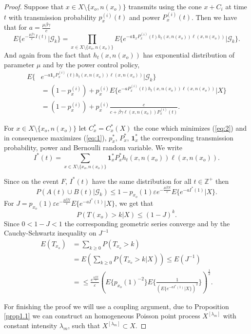 \begin{proof}
Suppose that $x\in X\setminus\lbrace x_o,n(x_o)\rbrace$ transmits using the cone $x+C_i$ at time $t$ with transmission probability $p_x^{(i)}(t)$ and power $P_x^{(i)}(t)$. Then we have that for $a=\frac{\mu\beta\gamma}{c}$
$$E\lbrace e^{-\frac{\mu\beta\gamma}{c}I(t)}\vert\mathcal{G}_k\rbrace=\prod_{x\in X\setminus\lbrace x_o,n(x_o)\rbrace}E\lbrace e^{-a\textbf{1}_x P_x^{(i)}(t)h_t(x,n(x_o))\ell(x,n(x_o))}\vert\mathcal{G}_k\rbrace.$$ And again from the fact that $h_t(x,n(x_o))$ has exponential distribution of parameter $\mu$ and by the power control policy,
\begin{align}
E\lbrace & e^{-a\textbf{1}_x P_x^{(i)}(t)h_t(x,n(x_o))\ell(x,n(x_o))}\vert\mathcal{G}_k\rbrace\nonumber\\
&=(1-p_x^{(i)})+p_x^{(i)}E\lbrace e^{-aP_x^{(i)}(t)h_t(x,n(x_o))\ell(x,n(x_o))}\vert X\rbrace\nonumber\\
&=(1-p_x^{(i)})+p_x^{(i)}\frac{c}{c+\beta\gamma\ell(x,n(x_o))P_x^{(i)}(t)}.\label{eq:2}
\end{align}

For $x\in X\setminus\lbrace x_o,n(x_o)\rbrace$ let $C_{x}^{*}=C_{x}^{*}(X)$ the cone which minimizes (\ref{eq:2}) and in consequence maximizes (\ref{eq:1}), $p^{*}_x$, $P^{*}_x$, $\textbf{1}^{*}_x$ the corresponding transmission probability, power and Bernoulli random variable. We write
$$I^{*}(t)=\sum_{x\in X\setminus\lbrace x_o,n(x_o)\rbrace}\textbf{1}_{x}^*P_{x}^*h_t(x,n(x_o))\ell(x,n(x_o)). $$

Since on the event $F$, $I^*(t)$ have the same distribution for all $t\in\mathbb{Z}^+$ then
$$P(A(t)\cup B(t)\vert\mathcal{G}_k)\leq 1-p_{x_o}(1)\varepsilon e^{-\frac{\mu\beta N}{c}}E\lbrace e^{-aI^*(1)}\vert X\rbrace.$$ For $J=p_{x_o}(1)\varepsilon e^{-\frac{\mu\beta N}{c}}E\lbrace e^{-aI^*(1)}\vert X\rbrace$, we get that $$P(T(x_o)>k\vert X)\leq (1-J)^k.$$ Since $0< 1-J< 1 $ the corresponding geometric series converge and by the Cauchy-Schwartz inequality on $J^{-1}$ 
\begin{align*}
E(T_{x_o})&=\sum_{k\geq 0}P(T_{x_o}>k)\\
&=E(\sum_{k\geq 0}P(T_{x_o}>k\vert X))\leq E(J^{-1})\\
&=\leq\frac{e^{\frac{\mu\beta N}{c}}}{\varepsilon}(E\lbrace p_{x_o}(1)^{-2}\rbrace E\lbrace\frac{1}{(E\lbrace e^{-aI^*(1)}\vert X
\rbrace)^2}\rbrace)^{\frac{1}{2}}.
\end{align*}

For finishing the proof we will use a coupling argument, due to Proposition \ref{prop1.1} we can construct an homogeneous Poisson point process $X^{[\lambda_m]}$  with constant intensity $\lambda_m$,  such that $X^{[\lambda_m]}\subset X.$


\end{proof}
